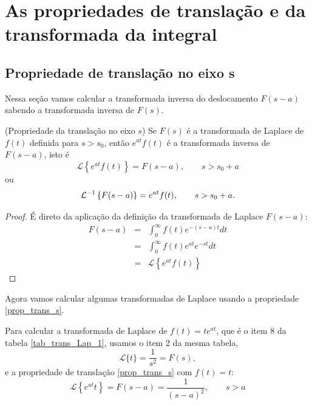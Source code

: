 \chapter{As propriedades de translação e da transformada da integral}
\section{Propriedade de translação no eixo s}
Nessa seção vamos calcular a transformada inversa do deslocamento $F(s-a)$ sabendo a transformada inversa de $F(s)$. %

\begin{teo}{\label{prop_trans_s}}(Propriedade da translação no eixo $s$) Se $F(s)$ é a transformada de Laplace de $f(t)$ definida para $s>s_0$, então $e^{at}f(t)$ é a transformada inversa de $F(s-a)$, isto é
\begin{equation}
\mathcal{L}\left\{e^{at}f(t)\right\} =F(s-a),\qquad s>s_0+a
\end{equation}
ou
\begin{equation}{\label{eq_trans_s_inv}}
\mathcal{L}^{-1} \left\{F(s-a)\right\} =e^{at}f(t),\qquad s>s_0+a.
\end{equation} 
\end{teo}
\begin{proof}É direto da aplicação da definição da transformada de Laplace $F(s-a)$:
\begin{eqnarray*}
 F(s-a)&=&\int_0^\infty f(t)e^{-(s-a)t}dt\\
&=&\int_0^\infty f(t)e^{at}e^{-st}dt\\
&=&\mathcal{L}\left\{e^{at}f(t)\right\}
 \end{eqnarray*}
\end{proof}
Agora vamos calcular algumas transformadas de Laplace usando a propriedade \ref{prop_trans_s}.
\begin{ex}Para calcular a transformada de Laplace de $f(t)=te^{at}$, que é o item 8 da tabela \ref{tab_trans_Lap_1}, usamos o item 2 da mesma tabela,
\begin{equation}
\mathcal{L}\{t\}=\frac{1}{s^2}=F(s),
\end{equation}
e a propriedade de translação \ref{prop_trans_s} com $f(t)=t$:
\begin{equation}
\mathcal{L}\left\{e^{at}t\right\} =F(s-a)=\frac{1}{(s-a)^2},\qquad s>a
\end{equation}
\end{ex}
